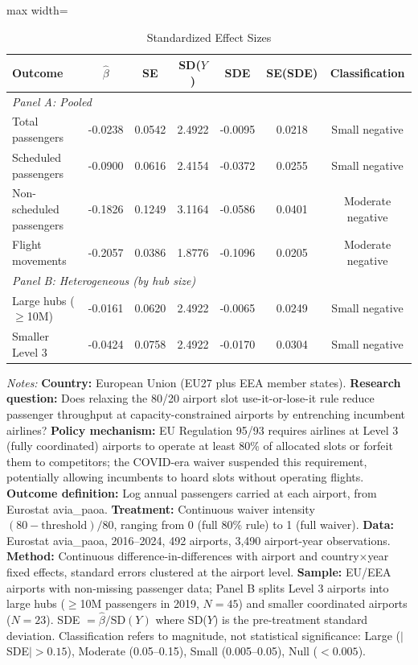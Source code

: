 \begin{table}[t]
\centering
\caption{Standardized Effect Sizes}
\label{tab:sde}
\small
\begin{adjustbox}{max width=\textwidth}
\begin{tabular}{lcccccc}
\toprule
Outcome & $\hat{\beta}$ & SE & SD($Y$) & SDE & SE(SDE) & Classification \\
\midrule
\multicolumn{7}{l}{\textit{Panel A: Pooled}} \\
\midrule
Total passengers & -0.0238 & 0.0542 & 2.4922 & -0.0095 & 0.0218 & Small negative \\
Scheduled passengers & -0.0900 & 0.0616 & 2.4154 & -0.0372 & 0.0255 & Small negative \\
Non-scheduled passengers & -0.1826 & 0.1249 & 3.1164 & -0.0586 & 0.0401 & Moderate negative \\
Flight movements & -0.2057 & 0.0386 & 1.8776 & -0.1096 & 0.0205 & Moderate negative \\
\midrule
\multicolumn{7}{l}{\textit{Panel B: Heterogeneous (by hub size)}} \\
\midrule
Large hubs ($\geq$10M) & -0.0161 & 0.0620 & 2.4922 & -0.0065 & 0.0249 & Small negative \\
Smaller Level 3 & -0.0424 & 0.0758 & 2.4922 & -0.0170 & 0.0304 & Small negative \\
\bottomrule
\end{tabular}
\end{adjustbox}
\par\vspace{0.3em}
{\footnotesize \textit{Notes:} \textbf{Country:} European Union (EU27 plus EEA member states). \textbf{Research question:} Does relaxing the 80/20 airport slot use-it-or-lose-it rule reduce passenger throughput at capacity-constrained airports by entrenching incumbent airlines? \textbf{Policy mechanism:} EU Regulation 95/93 requires airlines at Level 3 (fully coordinated) airports to operate at least 80\% of allocated slots or forfeit them to competitors; the COVID-era waiver suspended this requirement, potentially allowing incumbents to hoard slots without operating flights. \textbf{Outcome definition:} Log annual passengers carried at each airport, from Eurostat avia\_paoa. \textbf{Treatment:} Continuous waiver intensity $(80 - \text{threshold})/80$, ranging from 0 (full 80\% rule) to 1 (full waiver). \textbf{Data:} Eurostat avia\_paoa, 2016--2024, 492 airports, 3,490 airport-year observations. \textbf{Method:} Continuous difference-in-differences with airport and country$\times$year fixed effects, standard errors clustered at the airport level. \textbf{Sample:} EU/EEA airports with non-missing passenger data; Panel B splits Level 3 airports into large hubs ($\geq$10M passengers in 2019, $N=45$) and smaller coordinated airports ($N=23$). SDE $= \hat{\beta} / \text{SD}(Y)$ where SD($Y$) is the pre-treatment standard deviation. Classification refers to magnitude, not statistical significance: Large ($|$SDE$| > 0.15$), Moderate (0.05--0.15), Small (0.005--0.05), Null ($< 0.005$).}
\end{table}
